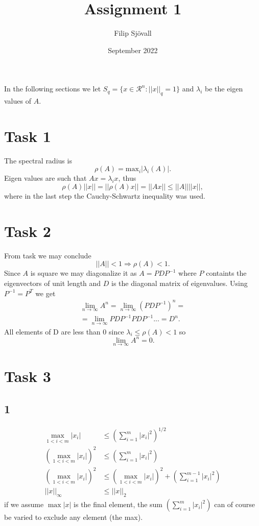 \documentclass{article}
\title{Assignment 1}
\author{Filip Sjövall}
\date{September 2022}
\begin{document}
\maketitle
In the following sections we let $ S_q = \{ x \in \mathcal{R}^n : ||x||_q = 1    \} $ and $\lambda_i$ be the eigen values of $A$. 
\section*{Task 1}
The spectral radius is
\begin{equation}
    \rho(A) = \text{max}_i | \lambda_i(A) | .
\end{equation}
Eigen values are such that $Ax = \lambda_i x$, thus
\begin{equation}
    \rho(A)||x|| = ||\rho(A)x|| = ||Ax|| \leq ||A|| ||x||,
\end{equation}
where in the last step the Cauchy-Schwartz inequality was used.
\section*{Task 2}
From task we may conclude
\begin{equation}
    ||A|| < 1 \Rightarrow \rho(A) < 1.
\end{equation}
Since $A$ is square we may diagonalize it as $A = P D P ^{-1}$ where $P$ containts the eigenvectors of unit length and $D$ is the diagonal matrix of eigenvalues. Using $P^{-1} = P^T$ we get
\begin{align*}
    \lim_{n \to \infty} A^n = \lim_{n \to \infty} (PDP^{-1})^n = \\
    = \lim_{n \to \infty} PDP^{-1}PDP^{-1}... = D^n.
\end{align*}
All elements of D are less than 0 since $\lambda_i \leq \rho(A) < 1$ so 
\begin{equation}
    \lim_{n \to \infty} A^n = 0.
\end{equation}
\section*{Task 3}
\subsection*{1}
\begin{align*}
     \max_{1<i<m} |x_i| & \leq \left( \sum_{i=1}^m |x_i|^2 \right)^{1/2} \\
     (\max_{1<i<m} |x_i|)^2 & \leq  \left( \sum_{i=1}^m |x_i|^2 \right)  \\
     (\max_{1<i<m} |x_i|)^2 & \leq  (\max_{1<i<m} |x_i|)^2 + \left(  \sum_{i=1}^{m-1} |x_i|^2 \right) \\
     || x ||_\infty & \leq || x ||_2
\end{align*}
if we assume $\max |x|$ is the final element, the sum $ \left( \sum_{i=1}^m |x_i|^2 \right)$ can of course be varied to exclude any element (the max).
\end{document}
